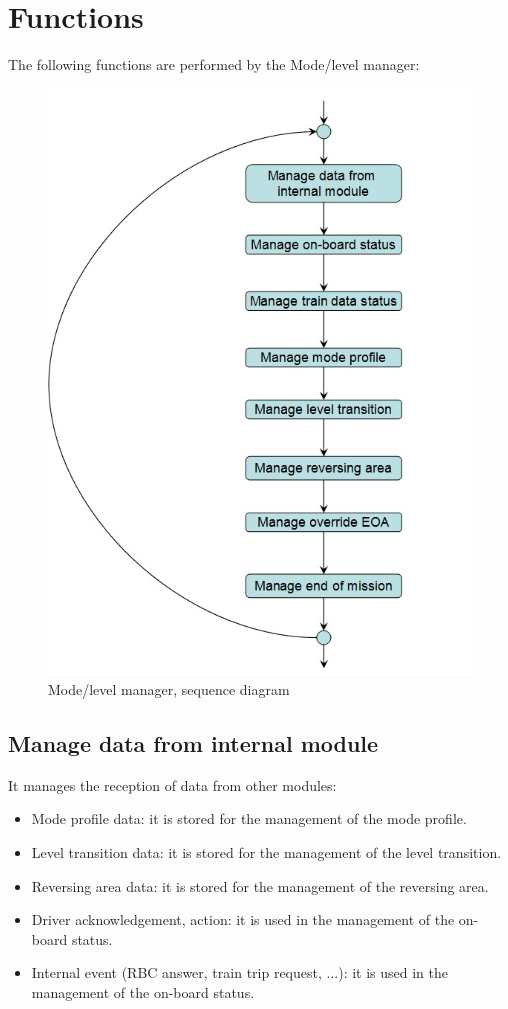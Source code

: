 \documentclass[nocc]{template/openetcs_report}
\begin{document}
\section{Functions}
The following functions are performed by the Mode/level manager:
\begin{figure}[!h]
  \centering
  \includegraphics[width=\textwidth]{image/evc_mode_level_manager}
  \caption{Mode/level manager, sequence diagram}
  \label{fig:Mode/level manager, sequence diagram}
\end{figure}
\subsection{Manage data from internal module}
It manages the reception of data from other modules:
\begin{itemize}
\item Mode profile data: it is stored for the management of the mode profile.
\item Level transition data: it is stored for the management of the level transition.
\item Reversing area data: it is stored for the management of the reversing area.
\item Driver acknowledgement, action: it is used in the management of the on-board status.
\item Internal event (RBC answer, train trip request, ...): it is used in the management of the on-board status.
\end{itemize}
\end{document}
